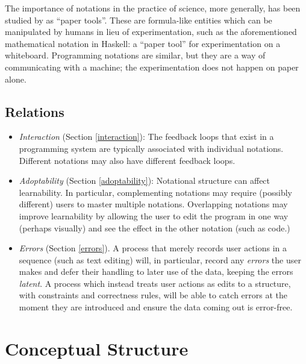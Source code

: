\documentclass[ twoside,openright,titlepage,numbers=noenddot,headinclude,footinclude,cleardoublepage=empty,abstract=on,
                BCOR=5mm,paper=a4,fontsize=11pt
                ]{scrreprt}
\providecommand{\tightlist}{}\newenvironment{longtable}[2]{\begin{tabular}}{\end{tabular}}
\theoremstyle{definition}
\begin{document}
The importance of notations in the practice of science, more generally,
has been studied by \parencite{PaperTools} as ``paper tools''. These are
formula-like entities which can be manipulated by humans in lieu of
experimentation, such as the aforementioned mathematical notation in
Haskell: a ``paper tool'' for experimentation on a whiteboard.
Programming notations are similar, but they are a way of communicating
with a machine; the experimentation does not happen on paper alone.

\hypertarget{relations-1}{\subsection{Relations}\label{relations-1}}

\begin{itemize}
\tightlist
\item
  \emph{Interaction} (Section \ref{interaction}): The feedback loops
  that exist in a programming system are typically associated with
  individual notations. Different notations may also have different
  feedback loops.
\item
  \emph{Adoptability} (Section \ref{adoptability}): Notational structure
  can affect learnability. In particular, complementing notations may
  require (possibly different) users to master multiple notations.
  Overlapping notations may improve learnability by allowing the user to
  edit the program in one way (perhaps visually) and see the effect in
  the other notation (such as code.)
\item
  \emph{Errors} (Section \ref{errors}). A process that merely records
  user actions in a sequence (such as text editing) will, in particular,
  record any \emph{errors} the user makes and defer their handling to
  later use of the data, keeping the errors \emph{latent}. A process
  which instead treats user actions as edits to a structure, with
  constraints and correctness rules, will be able to catch errors at the
  moment they are introduced and ensure the data coming out is
  error-free.
\end{itemize}

\hypertarget{conceptual-structure}{\section{Conceptual Structure}\label{conceptual-structure}}

\end{document}
